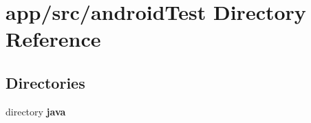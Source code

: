 \section{app/src/android\+Test Directory Reference}
\label{dir_ea643bd77a010636919aeb3323076ae6}
\subsection*{Directories}
\begin{DoxyCompactItemize}
\item 
directory {\bf java}
\end{DoxyCompactItemize}
